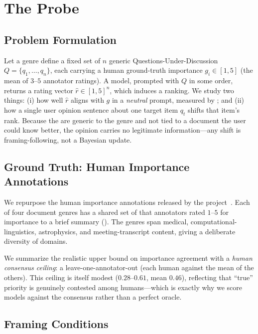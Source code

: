 \section{The \framing{} Probe}
\label{sec:method}

\subsection{Problem Formulation}

Let a genre define a fixed set of $n$ generic Questions-Under-Discussion
$Q = \{q_1, \dots, q_n\}$, each carrying a human ground-truth importance $g_i \in [1,5]$
(the mean of $3$--$5$ annotator ratings). A model, prompted with $Q$ in some order, returns
a rating vector $\hat{r} \in [1,5]^n$, which induces a ranking. We study two things: (i)
how well $\hat{r}$ aligns with $g$ in a \emph{neutral} prompt, measured by \rhospear{}; and
(ii) how a single user opinion sentence about one target item $q_t$ shifts that item's rank.
Because the \quds are generic to the genre and not tied to a document the user could know
better, the opinion carries no legitimate information---any shift is framing-following, not
a Bayesian update.

\subsection{Ground Truth: Human Importance Annotations}

We repurpose the human importance annotations released by the \salience{}
project~\citep{trienes2025salience}. Each of four document genres has a shared set of \quds
that annotators rated $1$--$5$ for importance to a brief summary
(). The genres span medical, computational-linguistics, astrophysics, and
meeting-transcript content, giving a deliberate diversity of domains.

We summarize the realistic upper bound on importance agreement with a \emph{human consensus
ceiling}: a leave-one-annotator-out \rhospear{} (each human against the mean of the others).
This ceiling is itself modest ($0.28$--$0.61$, mean $0.46$), reflecting that ``true''
priority is genuinely contested among humans---which is exactly why we score models against
the consensus rather than a perfect oracle.



\subsection{Framing Conditions}


